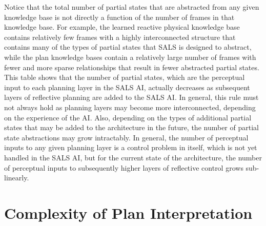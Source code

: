 Notice that the total number of partial states that are abstracted
from any given knowledge base is not directly a function of the number
of frames in that knowledge base.  For example, the learned reactive
physical knowledge base contains relatively few frames with a highly
interconnected structure that contains many of the types of partial
states that SALS is designed to abstract, while the plan knowledge
bases contain a relatively large number of frames with fewer and more
sparse relationships that result in fewer abstracted partial states.
This table shows that the number of partial states, which are the
perceptual input to each planning layer in the SALS AI, actually
decreases as subsequent layers of reflective planning are added to the
SALS AI.  In general, this rule must not always hold as planning
layers may become more interconnected, depending on the experience of
the AI.  Also, depending on the types of additional partial states
that may be added to the architecture in the future, the number of
partial state abstractions may grow intractably.  In general, the
number of perceptual inputs to any given planning layer is a control
problem in itself, which is not yet handled in the SALS AI, but for
the current state of the architecture, the number of perceptual inputs
to subsequently higher layers of reflective control grows
sub-linearly.

\section{Complexity of Plan Interpretation}

